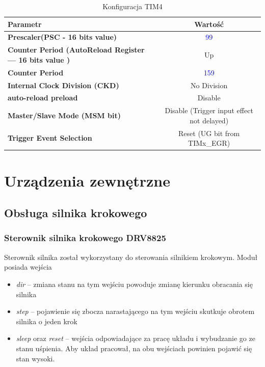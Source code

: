 \documentclass[10pt, a4paper]{article}
\begin{document}
\begin{table}[H]
	\centering
	\begin{tabular}{|l|c|} \hline
		\textbf{Parametr} & Wartość \\
		\hline
		\hline  \textbf{Prescaler(PSC - 16 bits value) }& \textcolor{blue}{99} \\ 
		\hline  \textbf{Counter Period (AutoReload Register --- 16 bits value )} & Up \\
		\hline  \textbf{Counter Period} & \textcolor{blue}{159} \\
		\hline  \textbf{Internal Clock Division (CKD) } & No Division\\
		\hline  \textbf{auto-reload preload} & Disable\\
		\hline  \textbf{Master/Slave Mode (MSM bit) } & Disable (Trigger input effect not delayed)
		\\
	\hline  \textbf{Trigger Event Selection} & Reset (UG bit from TIMx\_EGR)  \\
	\hline

	\end{tabular}
	\caption{Konfiguracja TIM4}
	\label{tab:TIM4}
\end{table}


\section{Urządzenia zewnętrzne}


\subsection{Obsługa silnika krokowego}
\subsubsection{Sterownik silnika krokowego DRV8825}
Sterownik silnika został wykorzystany do sterowania silnikiem krokowym. Moduł posiada wejścia
\begin{itemize}
    \item \emph{dir} -- zmiana stanu na tym wejściu powoduje zmianę kierunku obracania się silnika
    \item \emph{step} -- pojawienie się zbocza narastającego na tym wejściu skutkuje obrotem silnika o jeden krok
    \item \emph{sleep} oraz \emph{reset} -- wejścia odpowiadające za pracę układu i wybudzanie go ze stanu uśpienia. Aby układ pracował, na obu wejściach powinien pojawić się stan wysoki.
\end{itemize}
\end{document}
